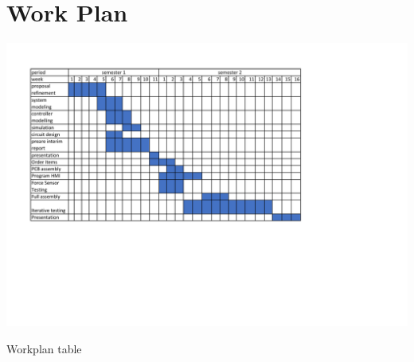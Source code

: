 \section{Work Plan}
\begin{center}
\begin{table}[!h]
\centering
\includegraphics[width=0.95\linewidth]{Figures/workplan}
\caption{Workplan table}
\end{table}
\end{center}
